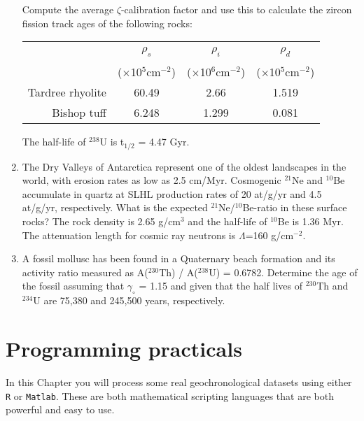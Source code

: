 \documentclass{book}
\begin{document}
\begin{enumerate}
Compute the average $\zeta$-calibration factor and use this to
calculate the zircon fission track ages of the following rocks:

\begin{centering}
\begin{tabular}{r@{~}c@{~}c@{~}c}
~ & $\rho_s$ & $\rho_i$ & $\rho_d$ \\
~ & ($\times$10$^5$cm$^{-2}$) & ($\times$10$^6$cm$^{-2}$) & ($\times$10$^5$cm$^{-2}$)\\
\hline
Tardree rhyolite & 60.49 & 2.66 & 1.519 \\
Bishop tuff & 6.248 & 1.299 & 0.081 \\
\end{tabular}
\end{centering}

The half-life of $^{238}$U is t$_{1/2}$ = 4.47 Gyr.\\

\item The Dry Valleys of Antarctica represent one of the oldest
  landscapes in the world, with erosion rates as low as 2.5
  cm/Myr. Cosmogenic $^{21}$Ne and $^{10}$Be accumulate in quartz at
  SLHL production rates of 20 at/g/yr and 4.5 at/g/yr,
  respectively. What is the expected $^{21}$Ne/$^{10}$Be-ratio in
  these surface rocks? The rock density is 2.65 g/cm$^{3}$ and the
  half-life of $^{10}$Be is 1.36 Myr. The attenuation length for
  cosmic ray neutrons is $\Lambda$=160
  g/cm$^{-2}$. 

\item A fossil mollusc has been found in a Quaternary beach formation
  and its activity ratio measured as A($^{230}$Th) / A($^{238}$U) =
  0.6782. Determine the age of the fossil assuming that $\gamma_\circ$
  = 1.15 and given that the half lives of $^{230}$Th and $^{234}$U are
  75,380 and 245,500 years,
  respectively. 

\end{enumerate}

\chapter{Programming practicals}
\label{sec:programming}

In this Chapter you will process some real geochronological datasets
using either \texttt{R} or \texttt{Matlab}. These are both
mathematical scripting languages that are both powerful and easy to
use.\\
\end{document}
